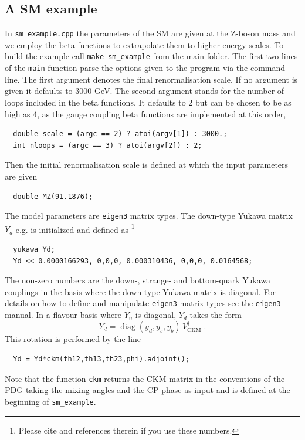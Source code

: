 \documentclass[11pt,a4paper]{article}
\begin{document}
\subsection{\label{sec::sm_example} A SM example}
In \texttt{sm\_example.cpp} the parameters of the SM are given at the Z-boson mass and we employ the beta functions to extrapolate them to higher energy scales. 
To build the example call \texttt{make sm\_example} from the main folder.
The first two lines of the \texttt{main} function parse the options given to the program via the command line. The first argument denotes the final renormalisation scale. If no argument is given it defaults to 3000 GeV. The
second argument stands for the number of loops included in the beta functions. It defaults to 2 but can be chosen to be as high as 4, as the gauge coupling beta functions are implemented at this order,
\begin{lstlisting}
  double scale = (argc == 2) ? atoi(argv[1]) : 3000.;
  int nloops = (argc == 3) ? atoi(argv[2]) : 2;
\end{lstlisting}
Then the initial renormalisation scale is defined at which the input parameters are given
\begin{lstlisting}
  double MZ(91.1876);
\end{lstlisting}
The model parameters are \texttt{eigen3} matrix types. The down-type Yukawa matrix $Y_d$ e.g. is initialized and defined as \footnote{Please cite \cite{Deppisch:2018flu} and references therein if you use these numbers.}
\begin{lstlisting}
  yukawa Yd; 
  Yd << 0.0000166293, 0,0,0, 0.000310436, 0,0,0, 0.0164568;
\end{lstlisting}
The non-zero numbers are the down-, strange- and bottom-quark Yukawa couplings in the basis where the down-type Yukawa matrix is diagonal.
For details on how to define and manipulate  \texttt{eigen3} matrix types see the \texttt{eigen3} manual. In a flavour basis where $Y_u$ is diagonal, $Y_d$ takes the form
\begin{equation}
    Y_d = \operatorname{diag}(y_d,y_s,y_b)\, V_{\mathrm{CKM}}^\dagger\;.
\end{equation}
This rotation is performed by the line
\begin{lstlisting}
  Yd = Yd*ckm(th12,th13,th23,phi).adjoint();
\end{lstlisting}
Note that the function \texttt{ckm} returns the CKM matrix in the conventions of the PDG \cite{Patrignani:2016xqp} taking the mixing angles and the CP phase as input and is defined at the beginning of \texttt{sm\_example}.
\end{document}
